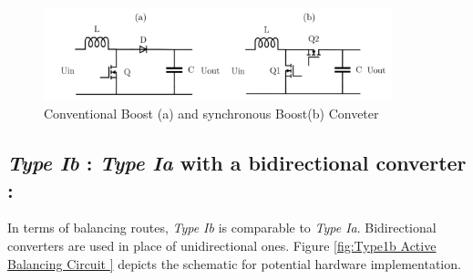\begin{figure}[h]
	\centering
	\includegraphics[width=0.9\textwidth]{Chap04/Figures/Conventiaonal_boost_synch_boost.PNG}
	\caption{Conventional Boost (a) and synchronous Boost(b) Conveter} 
	\label{fig:Conventional Boost (a) and synchronous Boost(b) Conveter}
\end{figure}

\subsection{\textit{Type Ib} : \textit{Type Ia} with a bidirectional converter :}
In terms of balancing routes, \textit{Type Ib} is comparable to \textit{Type Ia}. Bidirectional converters are used in place of unidirectional ones. Figure \ref{fig:Type1b Active Balancing Circuit } depicts the schematic for potential hardware implementation.\\

